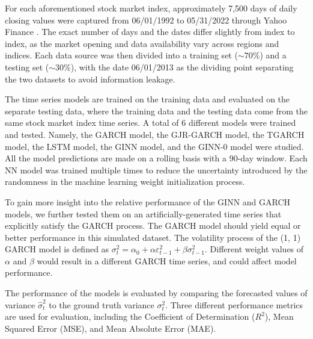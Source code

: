 For each aforementioned stock market index, approximately 7,500 days of daily closing values were captured from 06/01/1992 to 05/31/2022 through Yahoo Finance \cite{yahoo_yahoo_2023}. The exact number of days and the dates differ slightly from index to index, as the market opening and data availability vary across regions and indices. Each data source was then divided into a training set ($\sim 70\%$) and a testing set ($\sim 30\%$), with the date 06/01/2013 as the dividing point separating the two datasets to avoid information leakage. 

The time series models are trained on the training data and evaluated on the separate testing data, where the training data and the testing data come from the same stock market index time series. A total of 6 different models were trained and tested. Namely, the GARCH model, the GJR-GARCH model, the TGARCH model, the LSTM model, the GINN model, and the GINN-0 model were studied. All the model predictions are made on a rolling basis with a 90-day window. Each NN model was trained multiple times to reduce the uncertainty introduced by the randomness in the machine learning weight initialization process. 

To gain more insight into the relative performance of the GINN and GARCH models, we further tested them on an artificially-generated time series that explicitly satisfy the GARCH process. The GARCH model should yield equal or better performance in this simulated dataset. The volatility process of the (1, 1) GARCH model is defined as $\sigma_t^2 = \alpha_0 +  \alpha \varepsilon_{t-1}^2 +  \beta \sigma_{t-1}^2$. Different weight values of $\alpha$ and $\beta$ would result in a different GARCH time series, and could affect model performance. 

The performance of the models is evaluated by comparing the forecasted values of variance $\hat{\sigma}_t^2$ to the ground truth variance $\sigma_t^2$. Three different performance metrics are used for evaluation, including the Coefficient of Determination ($R^2$), Mean Squared Error (MSE), and Mean Absolute Error (MAE). 

